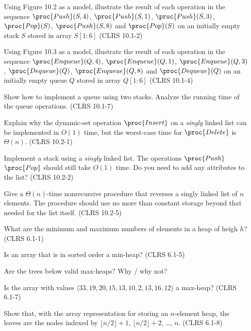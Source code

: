 \documentclass{article}
\begin{document}
\thispagestyle{fancy}

\begin{Exercise}[title={Stacks and queues}]

    \Question
    Using Figure 10.2 as a model, illustrate the result of each operation in the
    sequence $\proc{Push}(S,4)$, $\proc{Push}(S,1)$, $\proc{Push}(S,3)$,
    $\proc{Pop}(S)$, $\proc{Push}(S,8)$ and $\proc{Pop}(S)$ on an initially
    empty stack $S$ stored in array $S[1:6]$ (CLRS 10.1-2)

    \Question
    Using Figure 10.3 as a model, illustrate the result of each operation in the
    sequence $\proc{Enqueue}(Q,4)$, $\proc{Enqueue}(Q,1)$,
    $\proc{Enqueue}(Q,3)$, $\proc{Dequeue}(Q)$, $\proc{Enqueue}(Q,8)$ and
    $\proc{Dequeue}(Q)$ on an initially empty queue $Q$ stored in array $Q[1:6]$
    (CLRS 10.1-4)

    \Question
    Show how to implement a queue using two stacks. Analyze the running time of
    the queue operations. (CLRS 10.1-7)

\end{Exercise}

\begin{Exercise}[title={Linked lists}]
    \Question
    Explain why the dynamic-set operation $\proc{Insert}$ on a \textit{singly}
    linked list can be implemented in $O(1)$ time, but the worst-case time for
    $\proc{Delete}$ is $\Theta(n)$. (CLRS 10.2-1)

    \Question
    Implement a stack using a \textit{singly} linked list. The operations
    $\proc{Push}$ $\proc{Pop}$ should still take $O(1)$ time. Do you need to add
    any attributes to the list? (CLRS 10.2-2)

    \Question
    Give a $\Theta(n)$-time nonrecursive procedure that reverses a singly linked
    list of $n$ elements. The procedure should use no more than constant storage
    beyond that needed for the list itself. (CLRS 10.2-5)
\end{Exercise}

\begin{Exercise}[title={Heaps}]

    \Question
    What are the minimum and maximum numbers of elements in a heap of heigh $h$?
    (CLRS 6.1-1)
    
    \Question
    Is an array that is in sorted order a min-heap? (CLRS 6.1-5)

    \Question
    Are the trees below valid max-heaps? Why / why not?

    \Question
    Is the array with values $\langle 33, 19, 20, 15, 13, 10, 2, 13, 16, 12
    \rangle$ a max-heap? (CLRS 6.1-7)

    \Question
    Show that, with the array representation for storing an $n$-element heap,
    the leaves are the nodes indexed by $\lfloor n/2 \rfloor + 1$, $\lfloor n/2
    \rfloor + 2$, \ldots, $n$. (CLRS 6.1-8)

\end{Exercise}
\end{document}
